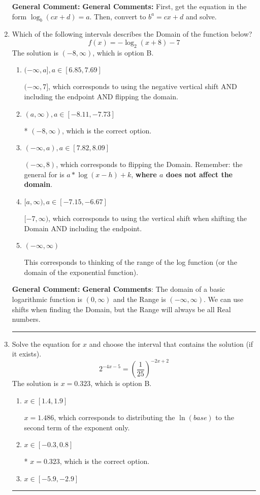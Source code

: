 \documentclass{extbook}[14pt]
\newcommand{\litem}[1]{\item #1

\rule{\textwidth}{0.4pt}}
\begin{document}
\begin{enumerate}
{\textbf{General Comment:} \textbf{General Comments:} First, get the equation in the form $\log_b{(cx+d)} = a$. Then, convert to $b^a = cx+d$ and solve.
}
\litem{
Which of the following intervals describes the Domain of the function below?
\[ f(x) = -\log_2{(x+8)}-7 \]The solution is \( (-8, \infty) \), which is option B.\begin{enumerate}[label=\Alph*.]
\item \( (-\infty, a], a \in [6.85, 7.69] \)

$(-\infty, 7]$, which corresponds to using the negative vertical shift AND including the endpoint AND flipping the domain.
\item \( (a, \infty), a \in [-8.11, -7.73] \)

* $(-8, \infty)$, which is the correct option.
\item \( (-\infty, a), a \in [7.82, 8.09] \)

$(-\infty, 8)$, which corresponds to flipping the Domain. Remember: the general for is $a*\log(x-h)+k$, \textbf{where $a$ does not affect the domain}.
\item \( [a, \infty), a \in [-7.15, -6.67] \)

$[-7, \infty)$, which corresponds to using the vertical shift when shifting the Domain AND including the endpoint.
\item \( (-\infty, \infty) \)

This corresponds to thinking of the range of the log function (or the domain of the exponential function).
\end{enumerate}

\textbf{General Comment:} \textbf{General Comments}: The domain of a basic logarithmic function is $(0, \infty)$ and the Range is $(-\infty, \infty)$. We can use shifts when finding the Domain, but the Range will always be all Real numbers.
}
\litem{
Solve the equation for $x$ and choose the interval that contains the solution (if it exists).
\[ 2^{-4x-5} = \left(\frac{1}{25}\right)^{-2x+2} \]The solution is \( x = 0.323 \), which is option B.\begin{enumerate}[label=\Alph*.]
\item \( x \in [1.4, 1.9] \)

$x = 1.486$, which corresponds to distributing the $\ln(base)$ to the second term of the exponent only.
\item \( x \in [-0.3, 0.8] \)

* $x = 0.323$, which is the correct option.
\item \( x \in [-5.9, -2.9] \)


\end{enumerate}}
\end{enumerate}
\end{document}

